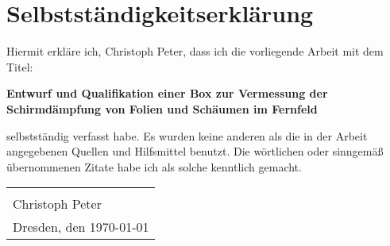 \chapter*{Selbstständigkeitserklärung}
\thispagestyle{empty}

\vspace*{2cm}

\begin{large}
Hiermit erkläre ich, Christoph Peter, dass ich die vorliegende Arbeit mit dem Titel: \par
\vspace{1cm}
\begin{center}
    \Large \textbf{Entwurf und Qualifikation einer Box zur Vermessung der Schirmdämpfung von Folien und
Schäumen im Fernfeld} \par
\end{center} 
\vspace{1cm}
\noindent selbstständig verfasst habe. Es wurden keine anderen als die in der Arbeit angegebenen Quellen und Hilfsmittel benutzt. Die wörtlichen oder sinngemäß übernommenen Zitate habe ich als solche kenntlich gemacht.

\vspace{3cm}

\begin{tabular}{p{6cm}}
    \dotfill \\
    Christoph Peter \\[3cm]
    Dresden, den \today
\end{tabular}

\end{large}